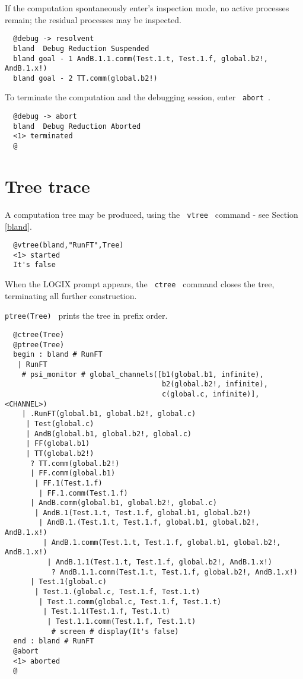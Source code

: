 \noindent
If the computation spontaneously enter's inspection mode,
no active processes remain; the residual processes may
be inspected.

\begin{verbatim}
  @debug -> resolvent
  bland  Debug Reduction Suspended
  bland goal - 1 AndB.1.1.comm(Test.1.t, Test.1.f, global.b2!, AndB.1.x!)
  bland goal - 2 TT.comm(global.b2!)
\end{verbatim}

\noindent
To terminate the computation and the debugging session,
enter \verb+ abort +.

\begin{verbatim}
  @debug -> abort
  bland  Debug Reduction Aborted
  <1> terminated
  @
\end{verbatim}

\section{Tree trace}
\label{vtree traces}

A computation tree may be produced, using the \verb+ vtree +
command - see Section \ref{bland}.

\begin{verbatim}
  @vtree(bland,"RunFT",Tree)
  <1> started
  It's false
\end{verbatim}

\noindent
When the LOGIX prompt appears,
the \verb+ ctree + command closes the tree, terminating
all further construction.

\noindent
\verb+ptree(Tree) + prints the tree in prefix order.

\begin{verbatim}
  @ctree(Tree)
  @ptree(Tree)
  begin : bland # RunFT
   | RunFT
    # psi_monitor # global_channels([b1(global.b1, infinite),
                                     b2(global.b2!, infinite),
                                     c(global.c, infinite)], <CHANNEL>)
    | .RunFT(global.b1, global.b2!, global.c)
     | Test(global.c)
     | AndB(global.b1, global.b2!, global.c)
     | FF(global.b1)
     | TT(global.b2!)
      ? TT.comm(global.b2!)
      | FF.comm(global.b1)
       | FF.1(Test.1.f)
        | FF.1.comm(Test.1.f)
      | AndB.comm(global.b1, global.b2!, global.c)
       | AndB.1(Test.1.t, Test.1.f, global.b1, global.b2!)
        | AndB.1.(Test.1.t, Test.1.f, global.b1, global.b2!, AndB.1.x!)
         | AndB.1.comm(Test.1.t, Test.1.f, global.b1, global.b2!, AndB.1.x!)
          | AndB.1.1(Test.1.t, Test.1.f, global.b2!, AndB.1.x!)
           ? AndB.1.1.comm(Test.1.t, Test.1.f, global.b2!, AndB.1.x!)
      | Test.1(global.c)
       | Test.1.(global.c, Test.1.f, Test.1.t)
        | Test.1.comm(global.c, Test.1.f, Test.1.t)
         | Test.1.1(Test.1.f, Test.1.t)
          | Test.1.1.comm(Test.1.f, Test.1.t)
           # screen # display(It's false)
  end : bland # RunFT
  @abort
  <1> aborted
  @
\end{verbatim}

